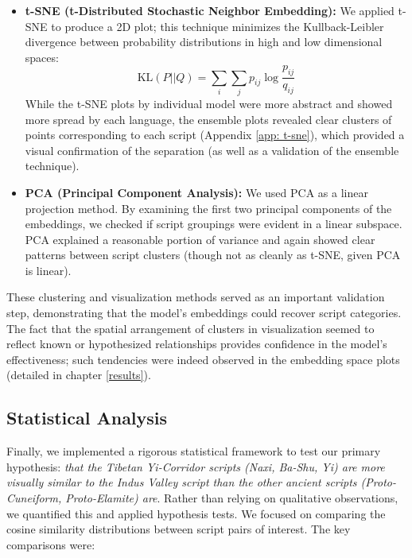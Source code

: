 \documentclass[11pt,a4paper,oneside]{report}
\begin{document}
\begin{itemize}
    \item \textbf{t-SNE (t-Distributed Stochastic Neighbor Embedding):} We applied t-SNE \cite{van_der_maaten_viualizing_2008} to produce a 2D plot; this technique minimizes the Kullback-Leibler divergence between probability distributions in high and low dimensional spaces:
    \begin{equation}
    \text{KL}(P||Q) = \sum_{i}\sum_{j}p_{ij}\log\frac{p_{ij}}{q_{ij}}
    \end{equation}
    While the t-SNE plots by individual model were more abstract and showed more spread by each language, the ensemble plots revealed clear clusters of points corresponding to each script (Appendix \ref{app: t-sne}), which provided a visual confirmation of the separation (as well as a validation of the ensemble technique).
    
    \item \textbf{PCA (Principal Component Analysis):} We used PCA as a linear projection method. By examining the first two principal components of the embeddings, we checked if script groupings were evident in a linear subspace. PCA explained a reasonable portion of variance and again showed clear patterns between script clusters (though not as cleanly as t-SNE, given PCA is linear). 
\end{itemize}

These clustering and visualization methods served as an important validation step, demonstrating that the model's embeddings could recover script categories. The fact that the spatial arrangement of clusters in visualization seemed to reflect known or hypothesized relationships provides confidence in the model's effectiveness; such tendencies were indeed observed in the embedding space plots (detailed in chapter \ref{results}).

\subsection{Statistical Analysis}
Finally, we implemented a rigorous statistical framework to test our primary hypothesis:\textit{ that the Tibetan Yi-Corridor scripts (Naxi, Ba-Shu, Yi) are more visually similar to the Indus Valley script than the other ancient scripts (Proto-Cuneiform, Proto-Elamite) are}. Rather than relying on qualitative observations, we quantified this and applied hypothesis tests. We focused on comparing the cosine similarity distributions between script pairs of interest. The key comparisons were:
\end{document}
